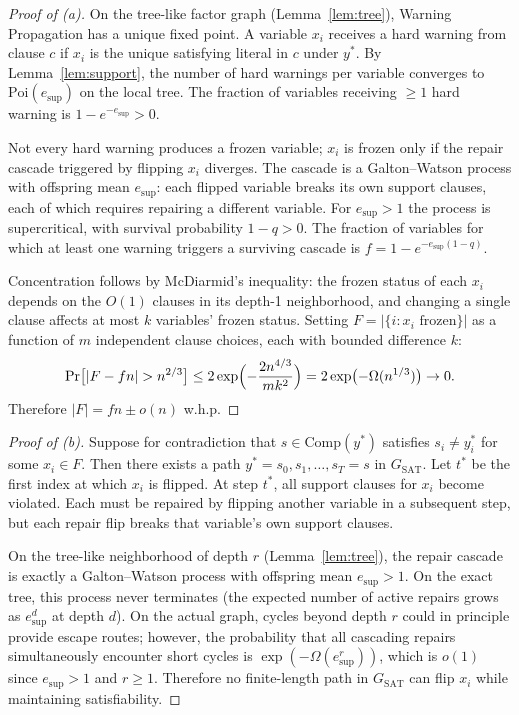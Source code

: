 \documentclass[11pt]{article}
\begin{document}
\begin{proof}[Proof of (a)]
On the tree-like factor graph (Lemma~\ref{lem:tree}), Warning Propagation has a unique fixed point.  A variable $x_i$ receives a hard warning from clause $c$ if $x_i$ is the unique satisfying literal in $c$ under $y^*$.  By Lemma~\ref{lem:support}, the number of hard warnings per variable converges to $\mathrm{Poi}(e_{\mathrm{sup}})$ on the local tree.  The fraction of variables receiving $\geq 1$ hard warning is $1 - e^{-e_{\mathrm{sup}}} > 0$.

Not every hard warning produces a frozen variable; $x_i$ is frozen only if the repair cascade triggered by flipping $x_i$ diverges.  The cascade is a Galton--Watson process with offspring mean $e_{\mathrm{sup}}$: each flipped variable breaks its own support clauses, each of which requires repairing a different variable.  For $e_{\mathrm{sup}} > 1$ the process is supercritical, with survival probability $1 - q > 0$.  The fraction of variables for which at least one warning triggers a surviving cascade is $f = 1 - e^{-e_{\mathrm{sup}}(1-q)}$.

Concentration follows by McDiarmid's inequality: the frozen status of each $x_i$ depends on the $O(1)$ clauses in its depth-1 neighborhood, and changing a single clause affects at most $k$ variables' frozen status.  Setting $F = |\{i : x_i \text{ frozen}\}|$ as a function of $m$ independent clause choices, each with bounded difference $k$:
\[
\Pr\bigl[|F - fn| > n^{2/3}\bigr] \leq 2\exp\Bigl(-\frac{2n^{4/3}}{mk^2}\Bigr) = 2\exp\bigl(-\Omega(n^{1/3})\bigr) \to 0.
\]
Therefore $|F| = fn \pm o(n)$ w.h.p.
\end{proof}

\begin{proof}[Proof of (b)]
Suppose for contradiction that $s \in \mathrm{Comp}(y^*)$ satisfies $s_i \neq y^*_i$ for some $x_i \in F$.  Then there exists a path $y^* = s_0, s_1, \ldots, s_T = s$ in $G_{\mathrm{SAT}}$.  Let $t^*$ be the first index at which $x_i$ is flipped.  At step $t^*$, all support clauses for $x_i$ become violated.  Each must be repaired by flipping another variable in a subsequent step, but each repair flip breaks that variable's own support clauses.

On the tree-like neighborhood of depth $r$ (Lemma~\ref{lem:tree}), the repair cascade is exactly a Galton--Watson process with offspring mean $e_{\mathrm{sup}} > 1$.  On the exact tree, this process never terminates (the expected number of active repairs grows as $e_{\mathrm{sup}}^d$ at depth $d$).  On the actual graph, cycles beyond depth $r$ could in principle provide escape routes; however, the probability that all cascading repairs simultaneously encounter short cycles is $\exp(-\Omega(e_{\mathrm{sup}}^r))$, which is $o(1)$ since $e_{\mathrm{sup}} > 1$ and $r \geq 1$.  Therefore no finite-length path in $G_{\mathrm{SAT}}$ can flip $x_i$ while maintaining satisfiability.
\end{proof}
\end{document}
